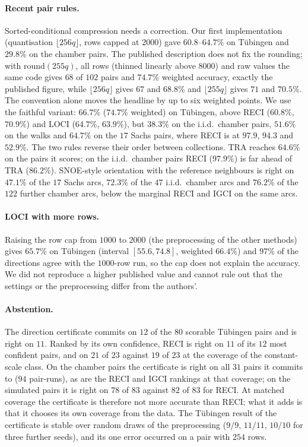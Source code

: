 \paragraph{Recent pair rules.} Sorted-conditional compression needs a correction. Our first implementation (quantisation $\lfloor 256q\rfloor$, rows capped at $2000$) gave $60.8$--$64.7\%$ on T\"ubingen and $29.8\%$ on the chamber pairs. The published description does not fix the rounding; with $\mathrm{round}(255q)$, all rows (thinned linearly above $8000$) and raw values the same code gives $68$ of $102$ pairs and $74.7\%$ weighted accuracy, exactly the published figure, while $\lfloor 256q\rfloor$ gives $67$ and $68.8\%$ and $\lfloor 255q\rfloor$ gives $71$ and $70.5\%$. The convention alone moves the headline by up to six weighted points. We use the faithful variant: $66.7\%$ ($74.7\%$ weighted) on T\"ubingen, above RECI ($60.8\%$, $70.9\%$) and LOCI ($64.7\%$, $63.9\%$), but $38.3\%$ on the i.i.d.\ chamber pairs, $51.6\%$ on the walks and $64.7\%$ on the $17$ Sachs pairs, where RECI is at $97.9$, $94.3$ and $52.9\%$. The two rules reverse their order between collections. TRA reaches $64.6\%$ on the pairs it scores; on the i.i.d.\ chamber pairs RECI ($97.9\%$) is far ahead of TRA ($86.2\%$). SNOE-style orientation with the reference neighbours is right on $47.1\%$ of the $17$ Sachs arcs, $72.3\%$ of the $47$ i.i.d.\ chamber arcs and $76.2\%$ of the $122$ further chamber arcs, below the marginal RECI and IGCI on the same arcs.

\paragraph{LOCI with more rows.}\label{sec:loci-check} Raising the row cap from $1000$ to $2000$ (the preprocessing of the other
methods) gives $65.7\%$ on Tübingen (interval $[55.6,74.8]$, weighted $66.4\%$) and $97\%$ of the directions agree
with the $1000$-row run, so the cap does not explain the accuracy. We did not reproduce a higher published value
and cannot rule out that the settings or the preprocessing differ from the authors'.

\paragraph{Abstention.} The direction certificate commits on $12$ of the $80$ scorable
Tübingen pairs and is right on $11$. Ranked by its own confidence, RECI is right on $11$ of
its $12$ most confident pairs, and on $21$ of $23$ against $19$ of $23$ at the coverage of the
constant-scale class. On the chamber pairs the certificate is right on all $31$ pairs it
commits to ($94$ pair-runs), as are the RECI and IGCI rankings at that coverage; on the
simulated pairs it is right on $78$ of $83$ against $82$ of $83$ for RECI. At matched coverage the
certificate is therefore not more accurate than RECI; what it adds is that it chooses its
own coverage from the data. The Tübingen result of the certificate is stable over random
draws of the preprocessing ($9/9$, $11/11$, $10/10$ for three further seeds), and its one
error occurred on a pair with $254$ rows.

